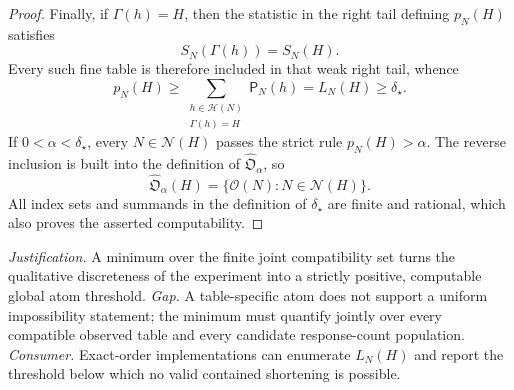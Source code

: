 \documentclass{article}
\begin{document}
\begin{proof}
Finally, if \(\Gamma(h)=H\), then the statistic in the right tail defining \(p_N(H)\) satisfies
\[
 S_N(\Gamma(h))=S_N(H).
\]
Every such fine table is therefore included in that weak right tail, whence
\[
 p_N(H)
 \ge\sum_{\substack{h\in\mathcal H(N)\\\Gamma(h)=H}}
       \mathsf P_N(h)
 =L_N(H)\ge\delta_\star.
\]
If \(0<\alpha<\delta_\star\), every \(N\in\mathcal N(H)\) passes the strict rule \(p_N(H)>\alpha\).  The reverse inclusion is built into the definition of \(\widehat{\mathfrak O}_\alpha\), so
\[
 \widehat{\mathfrak O}_{\alpha}(H)
 =\{\mathcal O(N):N\in\mathcal N(H)\}.
\]
All index sets and summands in the definition of \(\delta_\star\) are finite and rational, which also proves the asserted computability.
\end{proof}
\par\smallskip\noindent \textit{Justification.} A minimum over the finite joint compatibility set turns the qualitative discreteness of the experiment into a strictly positive, computable global atom threshold. \textit{Gap.} A table-specific atom does not support a uniform impossibility statement; the minimum must quantify jointly over every compatible observed table and every candidate response-count population. \textit{Consumer.} Exact-order implementations can enumerate \(L_N(H)\) and report the threshold below which no valid contained shortening is possible.
\end{document}
